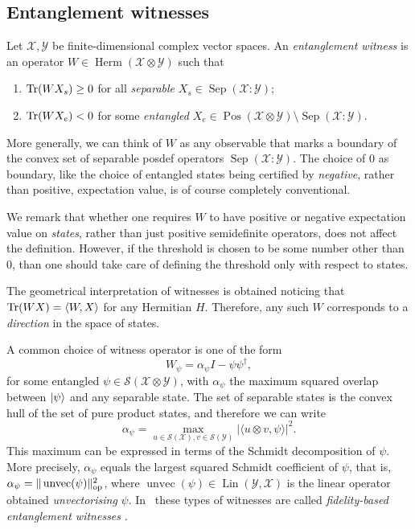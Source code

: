 \documentclass[12pt]{report}
\newcommand{\on}[1]{\operatorname{#1}}
\newcommand{\calY}{{\mathcal{Y}}}
\newcommand{\calS}{{\mathcal{S}}}
\newcommand{\calX}{{\mathcal{X}}}
\DeclareMathOperator{\Pos}{Pos}
\DeclareMathOperator{\Herm}{Herm}
\DeclareMathOperator{\Lin}{Lin}
\begin{document}
\subsection{Entanglement witnesses}

\begin{defn}
	Let $\calX,\calY$ be finite-dimensional complex vector spaces.
	An \emph{entanglement witness} is an operator $W\in\Herm(\calX\otimes\calY)$ such that
	\begin{enumerate}
		\item $\Tr(W X_s)\ge0$ for all \emph{separable} $ X_s\in\on{Sep}(\calX:\calY)$;
		\item $\Tr(W X_e)<0$ for some \emph{entangled} $X_e\in\Pos(\calX\otimes\calY)\setminus\on{Sep}(\calX:\calY)$.
	\end{enumerate}
\end{defn}
More generally, we can think of $W$ as any observable that marks a boundary of the convex set of separable posdef operators $\on{Sep}(\calX:\calY)$.
The choice of $0$ as boundary, like the choice of entangled states being certified by \emph{negative}, rather than positive, expectation value, is of course completely conventional.

We remark that whether one requires $W$ to have positive or negative expectation value on \emph{states}, rather than just positive semidefinite operators, does not affect the definition.
However, if the threshold is chosen to be some number other than $0$, than one should take care of defining the threshold only with respect to states.

The geometrical interpretation of witnesses is obtained noticing that $\Tr(WX)=\langle W,X\rangle$ for any Hermitian $H$. Therefore, any such $W$ corresponds to a \emph{direction} in the space of states.

A common choice of witness operator is one of the form
\begin{equation}
	W_\psi = \alpha_\psi I - \psi\psi^\dagger,
\end{equation}
for some entangled $\psi\in\calS(\calX\otimes\calY)$, with $\alpha_\psi$ the maximum squared overlap between $\ket\psi$ and any separable state.
The set of separable states is the convex hull of the set of pure product states, and therefore we can write
\begin{equation}
	\alpha_\psi = \max_{u\in\calS(\calX),v\in\calS(\calY)}
	\lvert \langle u\otimes v, \psi\rangle\rvert^2.
\end{equation}
This maximum can be expressed in terms of the Schmidt decomposition of $\psi$. More precisely, $\alpha_\psi$ equals the largest squared Schmidt coefficient of $\psi$, that is,
$\alpha_\psi = \|\on{unvec}(\psi)\|_{\rm op}^2$, where $\on{unvec}(\psi)\in\Lin(\calY,\calX)$ is the linear operator obtained \emph{unvectorising} $\psi$.
In~\parencite{guhne2020geometry} these types of witnesses are called \emph{fidelity-based entanglement witnesses} .
\end{document}
